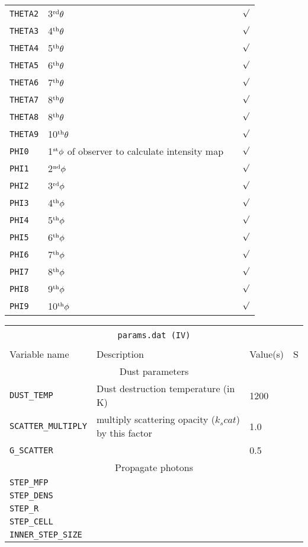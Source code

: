 \documentclass[12pt,a4paper]{article}
\begin{document}
{\begin{tabular}{|p{3.3cm}|p{10.4cm}|p{2.5cm}|p{0.3cm}|}
\texttt{THETA2} & 3$^{\rm rd}\theta$& & $\surd$\\
\texttt{THETA3} & 4$^{\rm th}\theta$& & $\surd$\\
\texttt{THETA4} & 5$^{\rm th}\theta$& & $\surd$\\
\texttt{THETA5} & 6$^{\rm th}\theta$& & $\surd$\\
\texttt{THETA6} & 7$^{\rm th}\theta$& & $\surd$\\
\texttt{THETA7} & 8$^{\rm th}\theta$& & $\surd$\\
\texttt{THETA8} & 8$^{\rm th}\theta$& & $\surd$\\
\texttt{THETA9} & 10$^{\rm th}\theta$& & $\surd$\\
\texttt{PHI0} & 1$^{\rm st}\phi$ of observer to calculate intensity map& & $\surd$\\
\texttt{PHI1} & 2$^{\rm nd}\phi$ & & $\surd$\\
\texttt{PHI2} & 3$^{\rm rd}\phi$ & & $\surd$\\
\texttt{PHI3} & 4$^{\rm th}\phi$ & & $\surd$\\
\texttt{PHI4} & 5$^{\rm th}\phi$ & & $\surd$\\
\texttt{PHI5} & 6$^{\rm th}\phi$ & & $\surd$\\
\texttt{PHI6} & 7$^{\rm th}\phi$ & & $\surd$\\
\texttt{PHI7} & 8$^{\rm th}\phi$ & & $\surd$\\
\texttt{PHI8} & 9$^{\rm th}\phi$ & & $\surd$\\
\texttt{PHI9} & 10$^{\rm th}\phi$ & & $\surd$\\
\hline
\end{tabular}
\par}

\vspace{1cm}

{\centering 
\begin{tabular}{|p{3.3cm}|p{10.4cm}|p{2.5cm}|p{0.3cm}|}
\hline
\multicolumn{4}{|c|}{}\\ 
\multicolumn{4}{|c|}{\large \texttt{params.dat (IV)} }\\ 
\multicolumn{4}{|c|}{}\\ 
\hline
Variable name & Description & Value(s) & S \\
\hline
\multicolumn{4}{|c|}{Dust parameters}\\
\hline
\texttt{DUST\_TEMP} & Dust destruction temperature (in K) & 1200 & \\
\texttt{SCATTER\_MULTIPLY} &  multiply scattering opacity ($k_scat$) by this factor & 1.0 & \\
\texttt{G\_SCATTER} &  & 0.5 & \\
\hline
\multicolumn{4}{|c|}{Propagate photons}\\
\hline
\texttt{STEP\_MFP} & & & \\
\texttt{STEP\_DENS} & & & \\
\texttt{STEP\_R} & & & \\
\texttt{STEP\_CELL} & & & \\
\texttt{INNER\_STEP\_SIZE} & & & \\
\hline
\end{tabular}
\par}
\end{document}
